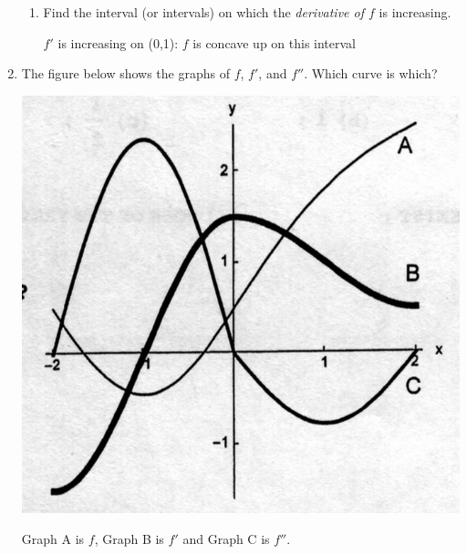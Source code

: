 \documentclass[nooutcomes]{ximera}
\begin{document}
\begin{problem}
\begin{enumerate}
\begin{enumerate}
        \item
          Find the interval (or intervals) on which the \emph{derivative of $f$} is increasing.
          \begin{freeResponse}
            $f'$ is increasing  on (0,1): $f$ is concave up on this interval
          \end{freeResponse}

      \end{enumerate}

    \item
      The figure below shows the graphs of $f$, $f'$, and $f''$.
      Which curve is which?
      \begin{image}
        \includegraphics[scale = 0.3]{figure2.png}
      \end{image}
      \begin{freeResponse}
        Graph A is $f$, Graph B is $f'$ and Graph C is $f''$.
      \end{freeResponse}


  \end{enumerate}
\end{problem}

	
	
\end{document}

